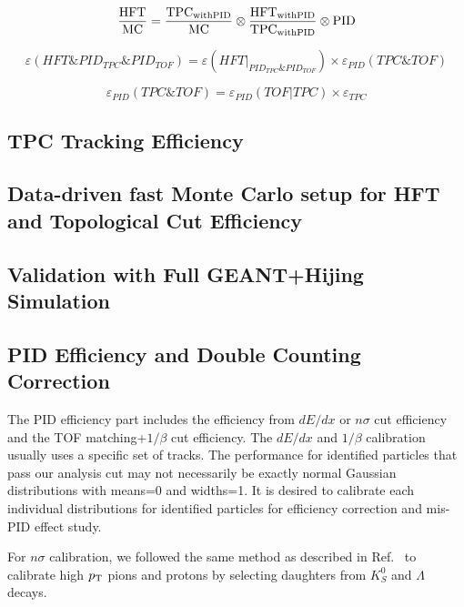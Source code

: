 \documentclass[a4paper]{article}
\begin{document}
\begin{equation}
  \frac{\textup{HFT}}{\textup{MC}} =  \frac{\textup{TPC}_\textup{{withPID}}}{\textup{MC}} \otimes \frac{\textup{HFT}_\textup{{withPID}}}{\textup{TPC}_\textup{{withPID}}} \otimes \textup{PID}
\label{effEqu2}
\end{equation}

\begin{equation}
  \varepsilon(HFT \& PID_{TPC} \& PID_{TOF}) = \varepsilon(HFT | _{PID_{TPC} \& PID_{TOF}}) \times \varepsilon_{PID}(TPC\&TOF)
\label{effEqu3}
\end{equation}

\begin{equation}
  \varepsilon_{PID}(TPC\&TOF) = \varepsilon_{PID}(TOF | TPC) \times \varepsilon_{TPC}
\label{effEqu4}
\end{equation}


\subsection{TPC Tracking Efficiency}

\subsection{Data-driven fast Monte Carlo setup for HFT and Topological Cut Efficiency}

\subsection{Validation with Full GEANT+Hijing Simulation}

\subsection{PID Efficiency and Double Counting Correction}

The PID efficiency part includes the efficiency from $dE/dx$ or $n\sigma$ cut efficiency and the TOF matching+$1/\beta$ cut efficiency. The $dE/dx$ and $1/\beta$ calibration usually uses a specific set of tracks. The performance for identified particles that pass our analysis cut may not necessarily be exactly normal Gaussian distributions with means=0 and widths=1. It is desired to calibrate each individual distributions for identified particles for efficiency correction and mis-PID effect study.

For $n\sigma$ calibration, we followed the same method as described in Ref.~\cite{Xu:2008th} to calibrate high $p_{\rm T}$ pions and protons by selecting daughters from $K_{S}^0$ and $\Lambda$ decays.
\end{document}
